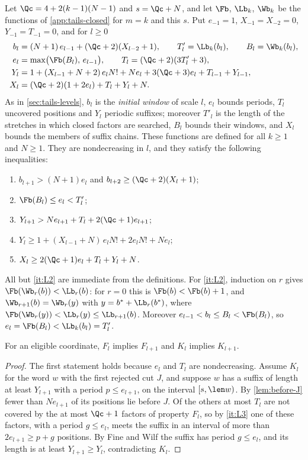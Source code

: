 Let $\Qc=4+2(k-1)(N-1)$ and $s=\Qc+N$, and let $\Fb$, $\Lb_k$, $\Wb_k$ be the
functions of \cref{app:tails-closed} for $m=k$ and this $s$. Put
$e_{-1}=1$, $X_{-1}=X_{-2}=0$, $Y_{-1}=T_{-1}=0$, and for $l\ge0$
\begin{align*}
  b_l&=(N+1)\,e_{l-1}+(\Qc+2)(X_{l-2}+1), \qquad
  T'_l=\Lb_k(b_l),\qquad B_l=\Wb_k(b_l),\\
  e_l&=\max\bigl(\Fb(B_l),\,e_{l-1}\bigr), \qquad
  T_l=(\Qc+2)(3T'_l+3),\\
  Y_l&=1+(X_{l-1}+N+2)\,e_lN!+Ne_l+3(\Qc+3)e_l+T_{l-1}+Y_{l-1}, \\
  X_l&=(\Qc+2)(1+2e_l)+T_l+Y_l+N .
\end{align*}
As in \cref{sec:tails-levels}, $b_l$ is the \emph{initial window} of scale
$l$, $e_l$ bounds periods, $T_l$ uncovered positions and $Y_l$ periodic
suffixes; moreover $T'_l$ is the length of the stretches in which closed
factors are searched, $B_l$ bounds their windows, and $X_l$ bounds the
members of suffix chains. These functions are defined for all $k\ge1$ and $N\ge1$. They
are nondecreasing in $l$, and they satisfy the following inequalities:
\begin{enumerate}[label=\textup{(L\arabic*)}]
\item\label{it:L1} $b_{l+1}>(N+1)e_l$ and $b_{l+2}\ge(\Qc+2)(X_l+1)$;
\item\label{it:L2} $\Fb(B_l)\le e_l<T'_l$;
\item\label{it:L3} $Y_{l+1}>Ne_{l+1}+T_l+2(\Qc+1)e_{l+1}$;
\item\label{it:L4} $Y_l\ge1+(X_{l-1}+N)\,e_lN!+2e_lN!+Ne_l$;
\item\label{it:L5} $X_l\ge2(\Qc+1)e_l+T_l+Y_l+N$.
\end{enumerate}
All but \ref{it:L2} are immediate from the definitions. For \ref{it:L2},
induction on $r$ gives $\Fb(\Wb_r(b))<\Lb_r(b)$: for $r=0$ this is
$\Fb(b)<\Fb(b)+1$, and $\Wb_{r+1}(b)=\Wb_r(y)$ with $y=b^*+\Lb_r(b^*)$, where
$\Fb(\Wb_r(y))<\Lb_r(y)\le\Lb_{r+1}(b)$. Moreover $e_{l-1}<b_l\le B_l<
\Fb(B_l)$, so $e_l=\Fb(B_l)<\Lb_k(b_l)=T'_l$.

\begin{lemma}\label{lem:levels-mono}
For an eligible coordinate, $F_l$ implies $F_{l+1}$ and $K_l$ implies
$K_{l+1}$.
\end{lemma}

\begin{proof}
The first statement holds because $e_l$ and $T_l$ are nondecreasing. Assume
$K_l$ for the word $w$ with the first rejected cut $J$, and suppose $w$ has
a suffix of length at least $Y_{l+1}$ with a period $p\le e_{l+1}$, on the
interval $[s,\len w)$. By \cref{lem:before-J} fewer than $Ne_{l+1}$ of its
positions lie before $J$. Of the others at most $T_l$ are not covered by the
at most $\Qc+1$ factors of property $F_l$, so by \ref{it:L3} one of
these factors, with a period $g\le e_l$, meets the suffix in an interval of
more than $2e_{l+1}\ge p+g$ positions. By Fine and Wilf the suffix has
period $g\le e_l$, and its length is at least $Y_{l+1}\ge Y_l$, contradicting
$K_l$.
\end{proof}

